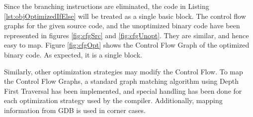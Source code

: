 Since the branching instructions are eliminated, the code in Listing \ref{lst:objOptimizedIfElse} will be treated as a single basic block. The control flow graphs for the given source code, and the unoptimized binary code have been represented in figures \ref{fig:cfgSrc} and \ref{fig:cfgUnopt}. They are similar, and hence easy to map. Figure \ref{fig:cfgOpt} shows the Control Flow Graph of the optimized binary code. As expected, it is a single block. 

Similarly, other optimization strategies may modify the Control Flow. To map the Control Flow Graphs, a standard graph matching algorithm using Depth First Traversal has been implemented, and special handling has been done for each optimization strategy used by the compiler. Additionally, mapping information from GDB is used in corner cases.

